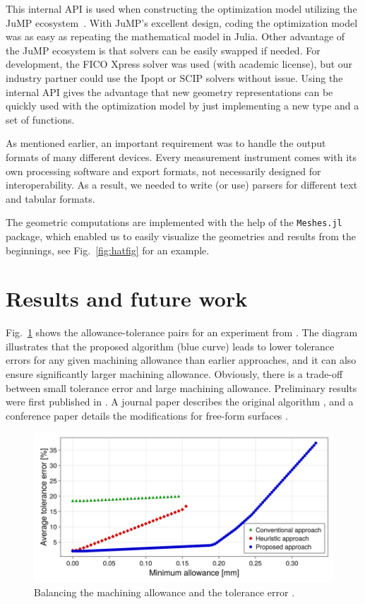 \documentclass{juliacon}
\begin{document}
This internal API is used when constructing the optimization model utilizing the JuMP ecosystem~\cite{Lubin2023}.
With JuMP's excellent design, coding the optimization model was as easy as repeating the mathematical model in Julia.
Other advantage of the JuMP ecosystem is that solvers can be easily swapped if needed.
For development, the FICO Xpress solver was used (with academic license), but our industry partner could use the Ipopt or SCIP solvers without issue.
Using the internal API gives the advantage that new geometry representations can be quickly used with the optimization model by just implementing a new type and a set of functions.

As mentioned earlier, an important requirement was to handle the output formats of many different devices.
Every measurement instrument comes with its own processing software and export formats, not necessarily designed for interoperability.
As a result, we needed to write (or use) parsers for different text and tabular formats.

The geometric computations are implemented with the help of the \texttt{Meshes.jl} package, which enabled us to easily visualize the geometries and results from the beginnings, see Fig.~\ref{fig:hatfig} for an example.

\section{Results and future work}
\label{sec:results}

Fig.~\ref{fig:pareto} shows the allowance-tolerance pairs for an experiment from \cite{cserteg:2023_Annals}.
The diagram illustrates that the proposed algorithm (blue curve) leads to lower tolerance errors for any given machining allowance than earlier approaches, and it can also ensure significantly larger machining allowance.
Obviously, there is a trade-off between small tolerance error and large machining allowance.
Preliminary results were first published in \cite{cserteg:2023_DigitalTwinAssisted}.
A journal paper describes the original algorithm \cite{cserteg:2023_Annals}, and a conference paper details the modifications for free-form surfaces \cite{cserteg:2023_CMS}.

\begin{figure}[t]
	\centerline{\includegraphics[width=0.95\columnwidth]{pareto-new-label.png}}
	\caption{Balancing the machining allowance and the tolerance error \cite{cserteg:2023_Annals}.}
	\label{fig:pareto}
\end{figure}
\end{document}
